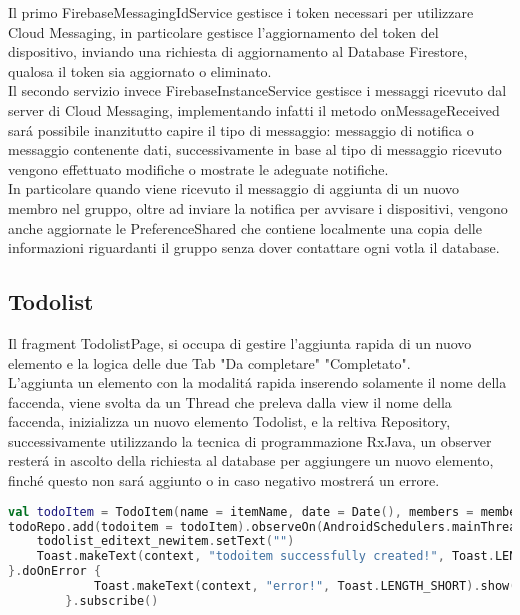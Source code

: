 Il primo FirebaseMessagingIdService gestisce i token necessari per utilizzare Cloud Messaging, in particolare gestisce l'aggiornamento del token del dispositivo, inviando una richiesta di aggiornamento al Database Firestore, qualosa il token sia aggiornato o eliminato.\\
Il secondo servizio invece FirebaseInstanceService gestisce i messaggi ricevuto dal server di Cloud Messaging, implementando infatti il metodo onMessageReceived sar\'a possibile inanzitutto capire il tipo di messaggio: messaggio di notifica o messaggio contenente dati, successivamente in base al tipo di messaggio ricevuto vengono effettuato modifiche o mostrate le adeguate notifiche.\\
In particolare quando viene ricevuto il messaggio di aggiunta di un nuovo membro nel gruppo, oltre ad inviare la notifica per avvisare i dispositivi, vengono anche aggiornate le PreferenceShared che contiene localmente una copia delle informazioni riguardanti il gruppo senza dover contattare ogni votla il database.


\subsection{Todolist}
Il fragment TodolistPage, si occupa di gestire l'aggiunta rapida di un nuovo elemento e la logica delle due Tab "Da completare" "Completato".\\
L'aggiunta un elemento con la modalit\'a rapida inserendo solamente il nome della faccenda, viene svolta da un Thread che preleva dalla view il nome della faccenda, inizializza un nuovo elemento Todolist, e la reltiva Repository, successivamente utilizzando la tecnica di programmazione RxJava, un observer rester\'a in ascolto della richiesta al database per aggiungere un nuovo elemento, finch\'e questo non sar\'a aggiunto o in caso negativo mostrer\'a un errore.

\begin{lstlisting}[language=kotlin,caption={Aggiunta elemento Todolist}]
val todoItem = TodoItem(name = itemName, date = Date(), members = members, created_by = userUID)
todoRepo.add(todoitem = todoItem).observeOn(AndroidSchedulers.mainThread()).subscribeOn(Schedulers.io()).doOnComplete {
    todolist_editext_newitem.setText("")
    Toast.makeText(context, "todoitem successfully created!", Toast.LENGTH_SHORT).show()
}.doOnError {
            Toast.makeText(context, "error!", Toast.LENGTH_SHORT).show()
        }.subscribe()
\end{lstlisting}

